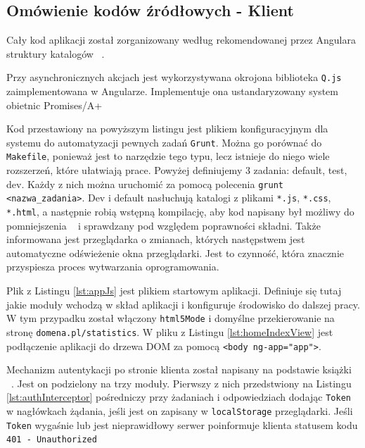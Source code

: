 \documentclass[10pt,titlepage]{article}
\begin{document}
\subsection{Omówienie kodów źródłowych - Klient}
\lstset{language=JavaScript}
\par Cały kod aplikacji został zorganizowany według rekomendowanej przez Angulara struktury katalogów ~\cite{angular:structure}.
\par Przy asynchronicznych akcjach jest wykorzystywana okrojona biblioteka \verb|Q.js| ~\cite{lib:q} zaimplementowana w Angularze. Implementuje ona ustandaryzowany system obietnic Promises/A+ ~\cite{doc:promises}

\par Kod przestawiony na powyższym listingu jest plikiem konfiguracyjnym dla systemu do automatyzacji pewnych zadań \verb|Grunt|. Można go porównać do \verb|Makefile|, ponieważ jest to narzędzie tego typu, lecz istnieje do niego wiele rozszerzeń, które ułatwiają prace. Powyżej definiujemy 3 zadania: default, test, dev. Każdy z nich można uruchomić za pomocą polecenia \verb|grunt <nazwa_zadania>|. Dev i default nasłuchują katalogi z plikami \verb|*.js|, \verb|*.css|, \verb|*.html|, a następnie robią wstępną kompilację, aby kod napisany był możliwy do pomniejszenia ~\cite{angular:minSafe} i sprawdzany pod względem poprawności składni. Także informowana jest przeglądarka o zmianach, których następstwem jest automatyczne odświeżenie okna przeglądarki. Jest to czynność, która znacznie przyspiesza proces wytwarzania oprogramowania.
\par Plik z Listingu \ref{lst:appJs} jest plikiem startowym aplikacji. Definiuje się tutaj jakie moduły wchodzą w skład aplikacji i konfiguruje środowisko do dalszej pracy. W tym przypadku został włączony \verb|html5Mode| i domyślne przekierowanie na stronę \verb|domena.pl/statistics|. W pliku z Listingu \ref{lst:homeIndexView} jest podłączenie aplikacji do drzewa DOM za pomocą \verb|<body ng-app="app">|.

Mechanizm autentykacji po stronie klienta został napisany na podstawie książki ~\cite{angular:bookMastering}. Jest on podzielony na trzy moduły. Pierwszy z nich przedstwiony na Listingu \ref{lst:authInterceptor} pośredniczy przy żadaniach \linebreak i odpowiedziach dodając \verb|Token| w nagłówkach żądania, jeśli jest on zapisany w \verb|localStorage| przeglądarki. Jeśli \verb|Token| wygaśnie lub jest nieprawidłowy serwer poinformuje klienta statusem kodu \verb|401 - Unauthorized| ~\cite{http:statuscodes}
\end{document}
